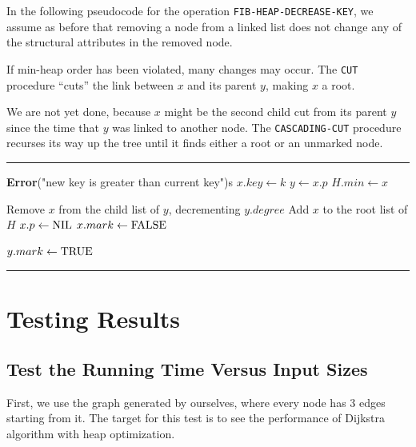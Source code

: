 \documentclass[twoside]{article}
\makeatletter
\newenvironment{breakablealgorithm}
  {%
   \begin{center}
     \refstepcounter{algorithm}%
     \hrule height.8pt depth0pt \kern2pt%
     \renewcommand{\caption}[2][\relax]{%
       {\raggedright\textbf{\ALG@name~\thealgorithm} ##2\par}%
       \ifx\relax##1\relax %
         \addcontentsline{loa}{algorithm}{\protect\numberline{\thealgorithm}##2}%
       \else %
         \addcontentsline{loa}{algorithm}{\protect\numberline{\thealgorithm}##1}%
       \fi
       \kern2pt\hrule\kern2pt
     }
  }{%
     \kern2pt\hrule\relax%
   \end{center}
  }
\makeatother
\begin{document}
\begin{CJK*}{UTF8}{gbsn}
\begin{itemize}
    In the following pseudocode for the operation \verb|FIB-HEAP-DECREASE-KEY|, we assume as before that removing a node from a linked list does not change any of the structural attributes in the removed node.

    If min-heap order has been violated, many changes may occur. The \verb|CUT| procedure “cuts” the link between $x$ and its parent $y$, making $x$ a root.
    
    We are not yet done, because $x$ might be the second child cut from its parent $y$ since the time that $y$ was linked to another node. The \verb|CASCADING-CUT| procedure recurses its way up the tree until it finds either a root or an unmarked node.
    \begin{breakablealgorithm}
        \begin{algorithmic}[1] 
                \State \textbf{Error}("new key is greater than current key")s
            \EndIf
            \State $x.key \leftarrow k$
            \State $y\leftarrow x.p$
                \State {}
                \State {}
            \EndIf
                \State $H.min\leftarrow x$
            \EndIf
            \EndFunction

            \State Remove $x$ from the child list of $y$, decrementing $y.degree$
            \State Add $x$ to the root list of $H$
            \State $x.p\leftarrow \rm{NIL}$
            \State $x.mark\leftarrow \rm{FALSE}$ 
            \EndProcedure

                    \State $y.mark\leftarrow \rm{TRUE}$
                \Else \State {}
                    \State {}
                \EndIf
            \EndIf
            \EndProcedure
        \end{algorithmic}
    \end{breakablealgorithm}
\end{itemize}

\section{Testing Results}
\subsection{Test the Running Time Versus Input Sizes}
First, we use the graph generated by ourselves, where every node has 3 edges starting from it. The target for this test is to see the performance of Dijkstra algorithm with heap optimization.  


\end{CJK*}
\end{document}
